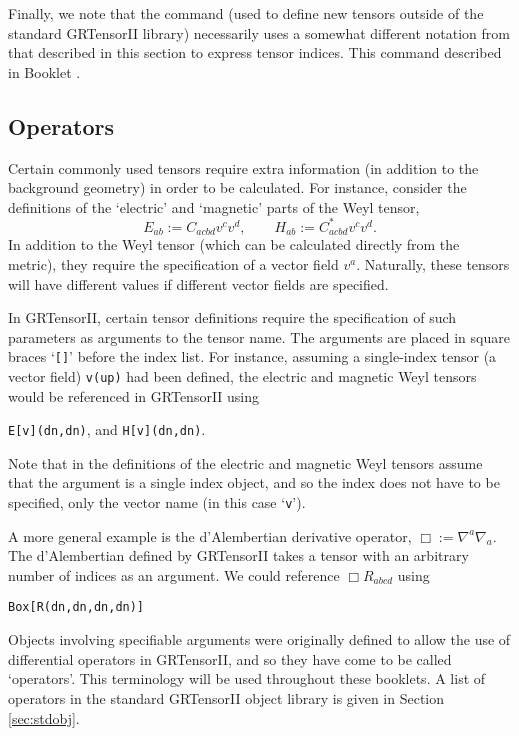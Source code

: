 \documentclass{article}
\begin{document}
Finally, we note that the  command (used to define new tensors
outside of the standard GRTensorII library) necessarily uses a somewhat
different notation from that described in this section to express tensor
indices. This command described in Booklet \grDefRef.
%
\subsection{Operators} \label{sec:operators}
%
Certain commonly used tensors require extra information (in addition
to the background geometry) in order to be calculated. For instance,
consider the definitions of the `electric' and `magnetic' parts of the
Weyl tensor,
\[
  E_{ab} := C_{acbd} v^c v^d, \qquad H_{ab} := C^*_{acbd} v^c v^d.
\]
In addition to the Weyl tensor (which can be calculated directly from
the metric), they require the specification of a vector field $v^a$.
Naturally, these tensors will have different values if different
vector fields are specified.

In GRTensorII, certain tensor definitions require the specification of
such parameters as arguments to the tensor name. The arguments are
placed in square braces `\texttt{[]}' before the index list.
For instance, assuming a single-index tensor (a vector field)
\texttt{v(up)} had been defined, the electric and magnetic Weyl tensors
would be referenced in GRTensorII using
\begin{center}
  \texttt{E[v](dn,dn)}, \quad and \quad \texttt{H[v](dn,dn)}.
\end{center}
Note that in the definitions of the electric and magnetic Weyl
tensors assume that the argument is a single index object, and
so the index does not have to be specified, only the vector name
(in this case `\texttt{v}').

A more general example is the d'Alembertian derivative operator,
$\Box := \nabla^a \nabla_a$. The d'Alembertian defined by GRTensorII
takes a tensor with an arbitrary number of indices as an argument.
We could reference $\Box R_{abcd}$ using
\begin{center}
  \texttt{Box[R(dn,dn,dn,dn)]}
\end{center}

Objects involving specifiable arguments were originally defined to allow
the use of differential operators in GRTensorII, and so they have come
to be called `operators'. This terminology will be used throughout these
booklets. A list of operators in the standard GRTensorII object library
is given in Section \ref{sec:stdobj}.
%
\end{document}
